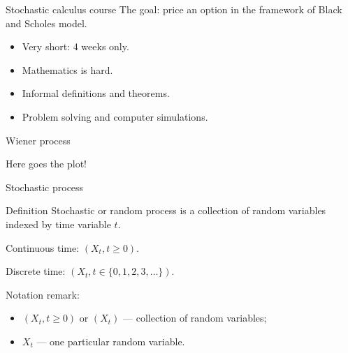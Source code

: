 
\begin{frame} %


\end{frame}


\begin{frame}{Stochastic calculus course}
  The goal: price an option in the framework of Black and Scholes model. 

  \begin{itemize}[<+->]
    \item Very short: \alert{4 weeks} only.
    \item Mathematics is \alert{hard}.
    \item \alert{Informal} definitions and theorems. 
    \item \alert{Problem solving} and computer \alert{simulations}. 
  \end{itemize}

\end{frame}


\begin{frame}{Wiener process}

  Here goes the plot!

\end{frame}


\begin{frame}{Stochastic process}

  \begin{block}{Definition \formalduck}
    \alert{Stochastic} or \alert{random process} is a collection of random variables indexed by time variable $t$. 
    \pause

    \alert{Continuous time}: $(X_t, t\geq 0)$.
    \pause 
    
    \alert{Discrete time}: $(X_t, t\in \{0, 1, 2, 3, \ldots \})$. 
\end{block}

\pause 
Notation remark:
\begin{itemize}[<+->]
  \item $(X_t, t\geq 0)$ or $(X_t)$ — collection of random variables;
  \item $X_t$ — one particular random variable. 
\end{itemize}


\end{frame}

